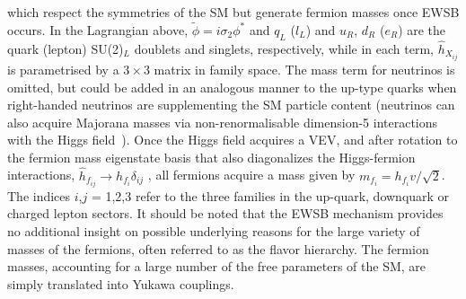 \documentclass[12pt]{article}
\begin{document}
which respect the symmetries of the SM but generate fermion
masses once EWSB occurs. In the Lagrangian above, $\tilde{\phi} = i\sigma_2\phi^*$ and $q_L$ ($l_L$) and $u_R$, $d_R$ ($e_R$) are the quark (lepton) SU(2)$_L$ doublets and singlets, respectively, while in each term, $\hat{h}_{X_{ij}}$ is parametrised by a $3\times3$ matrix in family space. The mass term for neutrinos is omitted, but could be added in an analogous manner to the up-type quarks when right-handed neutrinos are supplementing the SM particle content (neutrinos can also acquire Majorana masses via non-renormalisable dimension-5 interactions with the Higgs field~\cite{Weinberg:1979sa}). Once the Higgs field acquires a VEV, and after rotation to the fermion mass eigenstate basis that also diagonalizes the Higgs-fermion interactions, $\hat{h}_{f_{ij}} \rightarrow h_{f_i} \delta_{ij}$ , all fermions acquire a mass given by $m_{f_i} = h_{f_{i}} v/\sqrt{2}$. The indices $i$,$j$ = 1,2,3 refer to the three families in the up-quark, downquark or charged lepton sectors. It should be noted that the EWSB mechanism provides no additional insight on possible underlying reasons for the large variety of masses of the fermions, often referred to as the flavor hierarchy. The fermion masses, accounting for a large number of the free parameters of the SM, are simply translated into Yukawa couplings.



\end{document}
